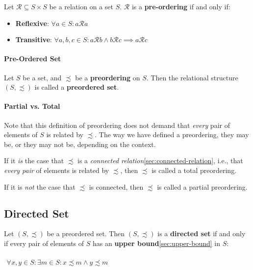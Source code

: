 Let $\mathcal{R} \subseteq S \times S$ be a relation on a set
$S$. $\mathcal{R}$ is a \textbf{pre-ordering} if and only if:

\begin{itemize}
\item \textbf{Reflexive}: $\forall a \in S: a \mathcal{R} a $
\item \textbf{Transitive}:
  $\forall a,b,c \in S: a \mathcal{R} b \land b \mathcal{R} c \implies
  a \mathcal{R} c $
\end{itemize}

\paragraph{Pre-Ordered Set}

Let $S$ be a set, and $\precsim$ be a \textbf{preordering} on
$S$. Then the relational structure $(S, \precsim)$ is called a
\textbf{preordered set}.


\paragraph{Partial vs. Total}

Note that this definition of preordering does not demand that
\textit{every} pair of elements of $S$ is related by $\precsim$. The
way we have defined a preordering, they may be, or they may not be,
depending on the context.

If it \textit{is} the case that $\precsim$ is a \textit{connected
  relation}\ref{sec:connected-relation}, i.e., that \textit{every
  pair} of elements is related by $\precsim$, then $\precsim$ is
called a total preordering.

If it is \textit{not} the case that $\precsim$ is connected, then
$\precsim$ is called a partial preordering.


\subsection{Directed Set}
\label{sec:directed-set}

Let $(S, \precsim)$ be a preordered set. Then $(S, \precsim)$ is a
\textbf{directed set} if and only if every pair of elements of $S$ has
an \textbf{upper bound}\ref{sec:upper-bound} in $S$:

\begin{math}
  \begin{array}{c}
    \\
    \forall x, y \in S: \exists m \in S: x \precsim m \land y \precsim m \\
    \\
  \end{array}
\end{math}

